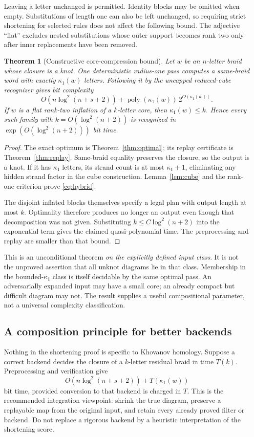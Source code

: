 \documentclass[11pt]{article}
\newtheorem{theorem}{Theorem}[section]
\theoremstyle{definition}
\theoremstyle{remark}
\newcommand{\poly}{\operatorname{poly}}
\begin{document}
Leaving a letter unchanged is permitted. Identity blocks may be omitted when
empty. Substitutions of length one can also be left unchanged, so requiring
strict shortening for selected rules does not affect the following bound.
The adjective ``flat'' excludes nested substitutions whose outer support
becomes rank two only after inner replacements have been removed.

\begin{theorem}[Constructive core-compression bound]\label{thm:core}
Let $w$ be an $n$-letter braid whose closure is a knot. One deterministic
radius-one pass computes a same-braid word with exactly $\kappa_1(w)$ letters.
Following it by the uncapped reduced-cube recognizer gives bit complexity
\begin{equation}\label{eq:hybrid}
 O(n\log^2(n+s+2))+
 \poly(\kappa_1(w))\,2^{O(\kappa_1(w))}.
\end{equation}
If $w$ is a flat rank-two inflation of a $k$-letter core, then
$\kappa_1(w)\le k$. Hence every such family with
$k=O(\log^2(n+2))$ is recognized in $\exp(O(\log^2(n+2)))$ bit time.
\end{theorem}
\begin{proof}
The exact optimum is Theorem~\ref{thm:optimal}; its replay certificate is
Theorem~\ref{thm:replay}. Same-braid equality preserves the closure, so the
output is a knot. If it has $\kappa_1$ letters, its strand count is at most
$\kappa_1+1$, eliminating any hidden strand factor in the cube construction.
Lemma~\ref{lem:cube} and the rank-one criterion prove \eqref{eq:hybrid}.

The disjoint inflated blocks themselves specify a legal plan with output
length at most $k$. Optimality therefore produces no longer an output even
though that decomposition was not given. Substituting
$k\le C\log^2(n+2)$ into the exponential term gives the claimed
quasi-polynomial time. The preprocessing and replay are smaller than that
bound.
\end{proof}

This is an unconditional theorem \emph{on the explicitly defined input
class}. It is not the unproved assertion that all unknot diagrams lie in that
class. Membership in the bounded-$\kappa_1$ class is itself decidable by the
same optimal pass. An adversarially expanded input may have a small core;
an already compact but difficult diagram may not. The result supplies a
useful compositional parameter, not a universal complexity classification.

\subsection{A composition principle for better backends}
Nothing in the shortening proof is specific to Khovanov homology. Suppose a
correct backend decides the closure of a $k$-letter residual braid in time
$T(k)$. Preprocessing and verification give
\[
 O(n\log^2(n+s+2))+T(\kappa_1(w))
\]
bit time, provided conversion to that backend is charged in $T$. This is the
recommended integration viewpoint: shrink the true diagram, preserve a
replayable map from the original input, and retain every already proved
filter or backend. Do not replace a rigorous backend by a heuristic
interpretation of the shortening score.
\end{document}
